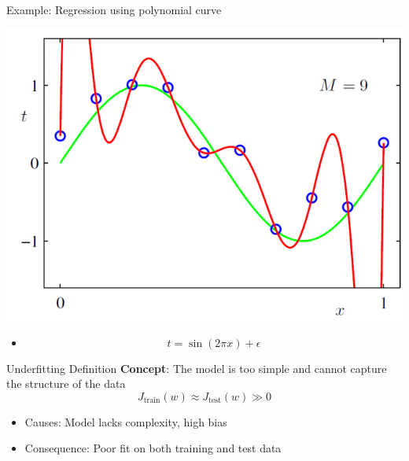 \documentclass[serif, aspectratio=169]{beamer}
\begin{document}
\begin{frame}{Example: Regression using polynomial curve}
\begin{minipage}{0.45\textwidth}
        \includegraphics[width=\linewidth]{pic/10.png}
    \end{minipage}%
\begin{minipage}{0.3\textwidth}
    \vspace{0.5cm} %
    \begin{itemize}
            \item \[t = \sin(2 \pi x) + \epsilon\]
        \end{itemize}
\end{minipage}
\end{frame}


\begin{frame}{Underfitting Definition}
    \textbf{Concept}: The model is too simple and cannot capture the structure of the data
    \[
    J_{\text{train}}(w) \approx J_{\text{test}}(w) \gg 0
    \]
    \begin{itemize}
        \item Causes: Model lacks complexity, high bias
        \item Consequence: Poor fit on both training and test data
    \end{itemize}
\end{frame}
\end{document}

